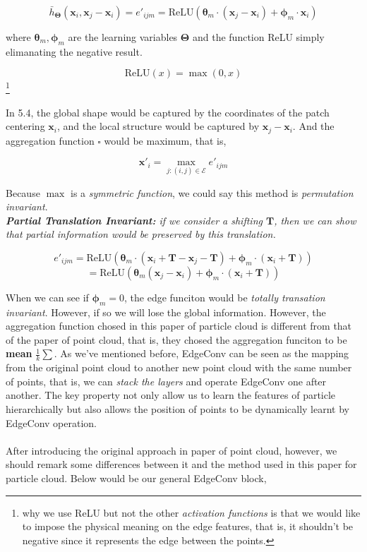 \documentclass[12pt]{article}
\numberwithin{equation}{section}
\begin{document}
\begin{equation}
    \bar{h}_{\pmb{\Theta}}(\mathbf{x}_i, \mathbf{x}_j-\mathbf{x}_i) = e'_{ijm} = \text{ReLU}\left(\pmb{\theta}_m\cdot\left(\mathbf{x}_j-\mathbf{x}_i\right)+\pmb{\phi}_m\cdot\mathbf{x}_i\right)
\end{equation}

where $\pmb{\theta}_m, \pmb{\phi}_m$ are the learning variables $\pmb{\Theta}$ and the function ReLU simply elimanating the negative result.

\[ \text{ReLU}(x) = \max(0, x) \]\footnote{why we use ReLU but not the other \textit{activation functions} is that we would like to impose the physical meaning on the edge features, that is, it shouldn't be negative since it represents the edge between the points.}

In 5.4, the global shape would be captured by the coordinates of the patch centering $\mathbf{x}_i$, and the local structure would be captured by $\mathbf{x}_j - \mathbf{x}_i$. And the aggregation function $\square$ would be maximum, that is,

\begin{equation}
    \mathbf{x}'_{i} = \mathop{\max}_{j: (i, j) \in \mathcal{E}}e'_{ijm}
\end{equation}

Because $\max$ is a \textit{symmetric function}, we could say this method is \textit{permutation invariant}.
\\
\indent \textit{\textbf{Partial Translation Invariant: }if we consider a shifting $\pmb{T}$, then we can show that partial information would be preserved by this translation.}

\[ e'_{ijm} = \text{ReLU}\left(\pmb{\theta}_m\cdot(\mathbf{x}_i+\pmb{T}-\mathbf{x}_j-\pmb{T})+\pmb{\phi}_m\cdot\left(\mathbf{x}_i+\pmb{T}\right)\right) \]
\[ = \text{ReLU}\left(\pmb{\theta}_m(\mathbf{x}_j-\mathbf{x}_i)+\pmb{\phi}_m\cdot\left(\mathbf{x}_i+\pmb{T}\right)\right)\]

When we can see if $\pmb{\phi}_m = 0$, the edge funciton would be \textit{totally transation invariant}. However, if so we will lose the global information. However, the aggregation function chosed in this paper of particle cloud is different from that of the paper of point cloud, that is, they chosed the aggregation funciton to be \textbf{mean} $\frac{1}{k}\sum$. As we've mentioned before, EdgeConv can be seen as the mapping from the original point cloud to another new point cloud with the same number of points, that is, we can \textit{stack the layers} and operate EdgeConv one after another. The key property not only allow us to learn the features of particle hierarchically but also 
allows the position of points to be dynamically learnt by EdgeConv operation.
\\\\
\indent After introducing the original approach in paper of point cloud, however, we should remark some differences between it and the method used in this paper for particle cloud. Below would be our general EdgeConv block,
\end{document}
